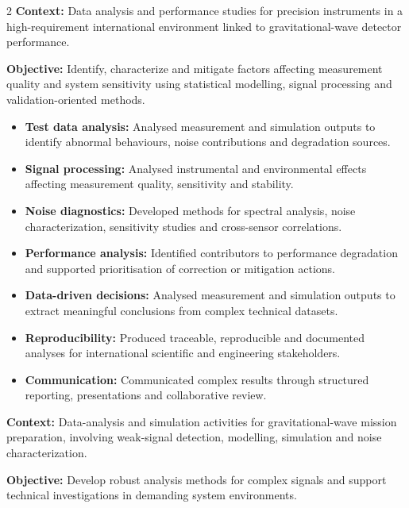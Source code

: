 \documentclass[8pt,a4paper,ragged2e,withhyper]{altacv}
\begin{document}
\begin{paracol}{2}
\textbf{Context:} Data analysis and performance studies for precision instruments in a high-requirement international environment linked to gravitational-wave detector performance.

\textbf{Objective:} Identify, characterize and mitigate factors affecting measurement quality and system sensitivity using statistical modelling, signal processing and validation-oriented methods.

\begin{itemize}
  \item \textbf{Test data analysis:} Analysed measurement and simulation outputs to identify abnormal behaviours, noise contributions and degradation sources.
  \item \textbf{Signal processing:} Analysed instrumental and environmental effects affecting measurement quality, sensitivity and stability.
  \item \textbf{Noise diagnostics:} Developed methods for spectral analysis, noise characterization, sensitivity studies and cross-sensor correlations.
  \item \textbf{Performance analysis:} Identified contributors to performance degradation and supported prioritisation of correction or mitigation actions.
  \item \textbf{Data-driven decisions:} Analysed measurement and simulation outputs to extract meaningful conclusions from complex technical datasets.
  \item \textbf{Reproducibility:} Produced traceable, reproducible and documented analyses for international scientific and engineering stakeholders.
  \item \textbf{Communication:} Communicated complex results through structured reporting, presentations and collaborative review.
\end{itemize}

\divider


\textbf{Context:} Data-analysis and simulation activities for gravitational-wave mission preparation, involving weak-signal detection, modelling, simulation and noise characterization.

\textbf{Objective:} Develop robust analysis methods for complex signals and support technical investigations in demanding system environments.


\end{paracol}
\end{document}
